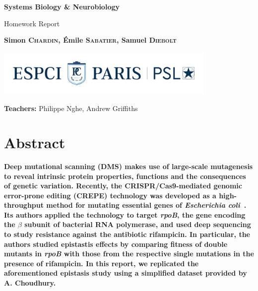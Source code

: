 \documentclass[12pt]{article}
\begin{document}
  \begin{titlepage}
    \begin{center}
      \vspace*{1cm}
 
      \Huge
      \textbf{Systems Biology \& Neurobiology}
 
      \vspace{0.5cm}
      \LARGE
      Homework Report
 
      \vspace{1.5cm}
 
      \Large\textbf{Simon \textsc{Chardin}, Émile \textsc{Sabatier}, Samuel
      \textsc{Diebolt}}

      \vspace{0.8cm}
 
      \vfill
 
      \vspace{0.8cm}

      \includegraphics[width=0.8\textwidth]{espci_logo}
 
      \Large
      \textbf{Teachers:} Philippe Nghe, Andrew Griffiths
    \end{center}
    \thispagestyle{empty}
  \end{titlepage}


  \section*{Abstract}

  \textbf{Deep mutational scanning (DMS) makes use of large-scale mutagenesis
  to reveal intrinsic protein properties, functions and the consequences of
  genetic variation. Recently, the CRISPR/Cas9-mediated genomic error-prone
  editing (CREPE) technology was developed as a high-throughput method for
  mutating essential genes of \textit{Escherichia coli}~\cite{choudhury2020}.
  Its authors applied the technology to target \textit{rpoB}, the gene encoding
  the $\beta$ subunit of bacterial RNA polymerase, and used deep sequencing to
  study resistance against the antibiotic rifampicin. In particular, the
  authors studied epistastis effects by comparing fitness of double mutants in
  \textit{rpoB} with those from the respective single mutations in the presence
  of rifampicin. In this report, we replicated the aforementioned epistasis
  study using a simplified dataset provided by A. Choudhury.}
\end{document}
